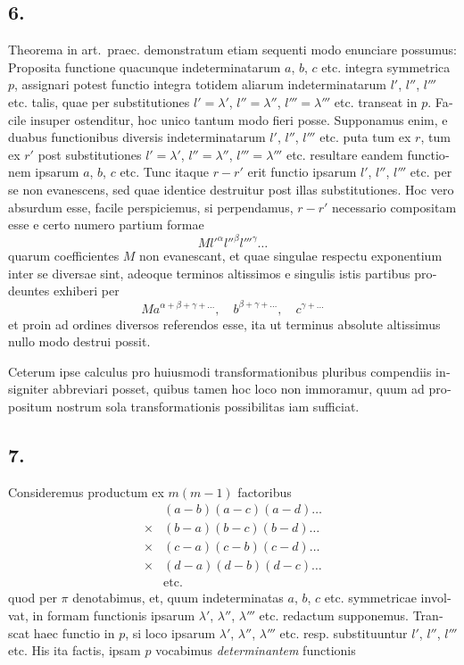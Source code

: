 \documentclass[12pt,a4paper]{article}
\begin{document}
\begin{otherlanguage}{latin}
\subsection*{6.}
Theorema in art.~praec. demonstratum etiam sequenti modo enunciare possumus: Proposita functione quacunque indeterminatarum $a$, $b$, $c$ etc. integra symmetrica $p$, assignari potest functio integra totidem aliarum indeterminatarum $l'$, $l''$, $l'''$ etc. talis, quae per substitutiones $l'=\lambda'$, $l''=\lambda''$, $l'''=\lambda'''$ etc. transeat in $p$. Facile insuper ostenditur, hoc unico tantum modo fieri posse. Supponamus enim, e duabus functionibus diversis indeterminatarum $l'$, $l''$, $l'''$ etc. puta tum ex $r$, tum ex $r'$ post substitutiones $l'=\lambda'$, $l''=\lambda''$, $l'''=\lambda'''$ etc. resultare eandem functionem ipsarum $a$, $b$, $c$ etc. Tunc itaque $r-r'$ erit functio ipsarum $l'$, $l''$, $l'''$ etc. per se non evanescens, sed quae identice destruitur post illas substitutiones. Hoc vero absurdum esse, facile perspiciemus, si perpendamus, $r-r'$ necessario compositam esse e certo numero partium formae
\[Ml'^{\alpha}l''^{\beta}l'''^{\gamma}\ldots\]
quarum coefficientes $M$ non evanescant, et quae singulae respectu exponentium inter se diversae sint, adeoque terminos altissimos e singulis istis partibus prodeuntes exhiberi per
\[Ma^{\alpha+\beta+\gamma+\ldots},\quad b^{\beta+\gamma+\ldots},\quad c^{\gamma+\ldots}\]
et proin ad ordines diversos referendos esse, ita ut terminus absolute altissimus nullo modo destrui possit.

Ceterum ipse calculus pro huiusmodi transformationibus pluribus compendiis insigniter abbreviari posset, quibus tamen hoc loco non immoramur, quum ad propositum nostrum sola transformationis possibilitas iam sufficiat.

\subsection*{7.}
Consideremus productum ex $m(m-1)$ factoribus
\begin{align*}
&(a-b)(a-c)(a-d)\ldots\\
\times&(b-a)(b-c)(b-d)\ldots\\
\times&(c-a)(c-b)(c-d)\ldots\\
\times&(d-a)(d-b)(d-c)\ldots\\
&\text{etc.}
\end{align*}
quod per $\pi$ denotabimus, et, quum indeterminatas $a$, $b$, $c$ etc. symmetricae involvat, in formam functionis ipsarum $\lambda'$, $\lambda''$, $\lambda'''$ etc. redactum supponemus. Transcat haec functio in $p$, si loco ipsarum $\lambda'$, $\lambda''$, $\lambda'''$ etc. resp. substituuntur $l'$, $l''$, $l'''$ etc. His ita factis, ipsam $p$ vocabimus \textit{determinantem} functionis

\end{otherlanguage}
\end{document}
